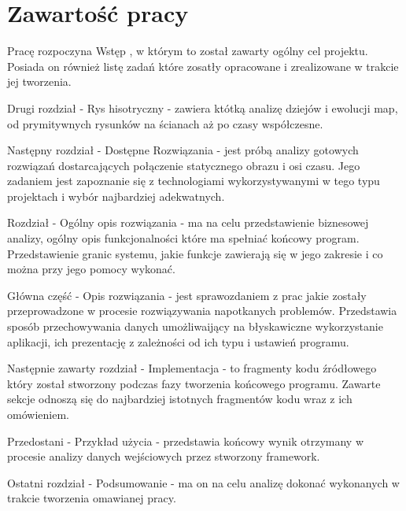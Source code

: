 \section{Zawartość pracy}
\label{sec:zawartoscPracy}


Pracę rozpoczyna Wstęp , w którym to został zawarty ogólny cel projektu. Posiada on również listę zadań które zosatły
opracowane i zrealizowane w trakcie jej tworzenia.

Drugi rozdział - Rys hisotryczny - zawiera któtką analizę dziejów i ewolucji map, od prymitywnych rysunków na ścianach aż 
po czasy współczesne.

Następny rozdział - Dostępne Rozwiązania - jest próbą analizy gotowych rozwiązań dostarcających połączenie statycznego obrazu 
i osi czasu. Jego zadaniem jest zapoznanie się z technologiami wykorzystywanymi w tego typu projektach i wybór najbardziej 
adekwatnych.

Rozdział - Ogólny opis rozwiązania - ma na celu przedstawienie biznesowej analizy, ogólny opis funkcjonalności które ma 
spełniać końcowy program. Przedstawienie granic systemu, jakie funkcje zawierają się w jego zakresie i co można przy jego 
pomocy wykonać.

Główna część - Opis rozwiązania - jest sprawozdaniem z prac jakie zostały przeprowadzone w procesie rozwiązywania napotkanych
problemów. Przedstawia sposób przechowywania danych umożliwaijący na błyskawiczne wykorzystanie aplikacji, ich prezentację 
z zależności od ich typu i ustawień programu. 

Następnie zawarty rozdział - Implementacja - to fragmenty kodu źródłowego który został stworzony podczas fazy tworzenia 
końcowego programu. Zawarte sekcje odnoszą się do najbardziej istotnych fragmentów kodu wraz z ich omówieniem.

Przedostani - Przykład użycia - przedstawia końcowy wynik otrzymany w procesie analizy danych wejściowych przez stworzony 
framework. 

Ostatni rozdział - Podsumowanie - ma on na celu analizę dokonać wykonanych w trakcie tworzenia omawianej pracy. 












